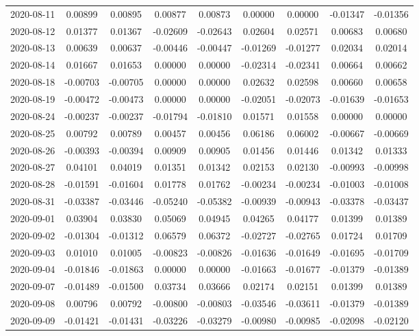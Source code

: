 {\begin{footnotesize}
\begin{longtable}{lcccccccc}
2020-08-11 & 0.00899 & 0.00895 & 0.00877 & 0.00873 & 0.00000 & 0.00000 & -0.01347 & -0.01356 \\
2020-08-12 & 0.01377 & 0.01367 & -0.02609 & -0.02643 & 0.02604 & 0.02571 & 0.00683 & 0.00680 \\
2020-08-13 & 0.00639 & 0.00637 & -0.00446 & -0.00447 & -0.01269 & -0.01277 & 0.02034 & 0.02014 \\
2020-08-14 & 0.01667 & 0.01653 & 0.00000 & 0.00000 & -0.02314 & -0.02341 & 0.00664 & 0.00662 \\
2020-08-18 & -0.00703 & -0.00705 & 0.00000 & 0.00000 & 0.02632 & 0.02598 & 0.00660 & 0.00658 \\
2020-08-19 & -0.00472 & -0.00473 & 0.00000 & 0.00000 & -0.02051 & -0.02073 & -0.01639 & -0.01653 \\
2020-08-24 & -0.00237 & -0.00237 & -0.01794 & -0.01810 & 0.01571 & 0.01558 & 0.00000 & 0.00000 \\
2020-08-25 & 0.00792 & 0.00789 & 0.00457 & 0.00456 & 0.06186 & 0.06002 & -0.00667 & -0.00669 \\
2020-08-26 & -0.00393 & -0.00394 & 0.00909 & 0.00905 & 0.01456 & 0.01446 & 0.01342 & 0.01333 \\
2020-08-27 & 0.04101 & 0.04019 & 0.01351 & 0.01342 & 0.02153 & 0.02130 & -0.00993 & -0.00998 \\
2020-08-28 & -0.01591 & -0.01604 & 0.01778 & 0.01762 & -0.00234 & -0.00234 & -0.01003 & -0.01008 \\
2020-08-31 & -0.03387 & -0.03446 & -0.05240 & -0.05382 & -0.00939 & -0.00943 & -0.03378 & -0.03437 \\
2020-09-01 & 0.03904 & 0.03830 & 0.05069 & 0.04945 & 0.04265 & 0.04177 & 0.01399 & 0.01389 \\
2020-09-02 & -0.01304 & -0.01312 & 0.06579 & 0.06372 & -0.02727 & -0.02765 & 0.01724 & 0.01709 \\
2020-09-03 & 0.01010 & 0.01005 & -0.00823 & -0.00826 & -0.01636 & -0.01649 & -0.01695 & -0.01709 \\
2020-09-04 & -0.01846 & -0.01863 & 0.00000 & 0.00000 & -0.01663 & -0.01677 & -0.01379 & -0.01389 \\
2020-09-07 & -0.01489 & -0.01500 & 0.03734 & 0.03666 & 0.02174 & 0.02151 & 0.01399 & 0.01389 \\
2020-09-08 & 0.00796 & 0.00792 & -0.00800 & -0.00803 & -0.03546 & -0.03611 & -0.01379 & -0.01389 \\
2020-09-09 & -0.01421 & -0.01431 & -0.03226 & -0.03279 & -0.00980 & -0.00985 & -0.02098 & -0.02120 \\

\end{longtable}
\end{footnotesize}}
